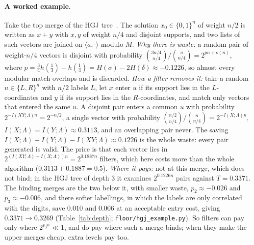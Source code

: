 \documentclass[11pt]{article}
\theoremstyle{definition}
\theoremstyle{remark}
\begin{document}
\paragraph{A worked example.} Take the top merge of the HGJ tree~\cite{HGJ10}. The solution $x_0\in\{0,1\}^n$ of
weight $n/2$ is written as $x+y$ with $x,y$ of weight $n/4$ and disjoint supports, and two lists of such vectors are
joined on $\langle a,\cdot\rangle$ modulo $M$. \emph{Why there is waste:} a random pair of weight-$n/4$ vectors is
disjoint with probability $\binom{3n/4}{n/4}/\binom{n}{n/4}=2^{pn+o(n)}$, where
$p=\tfrac34h(\tfrac13)-h(\tfrac14)=H(\sigma)-2H(\delta)\approx-0.1226$, so almost every modular match overlaps and is
discarded. \emph{How a filter removes it:} take a random $u\in\{L,R\}^n$ with $n/2$ labels $L$, let $x$ enter $u$ if
its support lies in the $L$-coordinates and $y$ if its support lies in the $R$-coordinates, and match only vectors
that entered the same $u$. A disjoint pair enters a common $u$ with probability $2^{-I(XY;\Lambda)n}=2^{-n/2}$, a single
vector with probability $\binom{n/2}{n/4}/\binom{n}{n/4}=2^{-I(X;\Lambda)n}$, $I(X;\Lambda)=I(Y;\Lambda)\approx0.3113$, and an
overlapping pair never. The saving $I(X;\Lambda)+I(Y;\Lambda)-I(XY;\Lambda)\approx0.1226$ is the whole waste: every pair
generated is valid. The price is that each vector lies in $2^{(I(XY;\Lambda)-I(X;\Lambda))n}=2^{0.1887n}$ filters,
which here costs more than the whole algorithm ($0.3113+0.1887=0.5$). \emph{Where it pays:} not at this merge, which
does not bind; in the HGJ tree of depth $3$ it examines $2^{0.1226n}$ pairs against $T=0.3371$. The binding merges are
the two below it, with smaller waste, $p_2\approx-0.026$ and $p_3\approx-0.006$, and there softer labellings, in which
the labels are only correlated with the digits, save $0.010$ and $0.006$ at an acceptable entry cost, giving
$0.3371\to0.3269$ (Table~\ref{tab:depth}; \texttt{floor/hgj\_example.py}). So filters can pay only where
$2^{p_jn}\ll1$, and do pay where such a merge binds; when they make the upper merges cheap, extra levels pay too.
\end{document}
